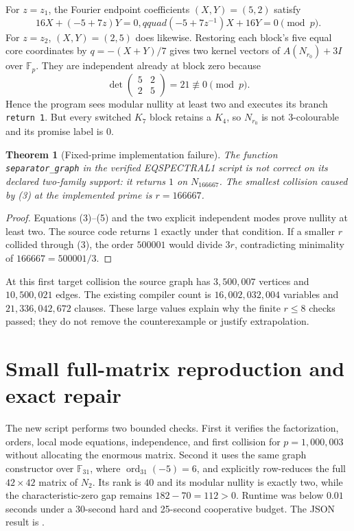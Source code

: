 \documentclass[11pt]{article}
\newtheorem{theorem}{Theorem}
\begin{document}
For $z=z_1$, the Fourier endpoint coefficients $(X,Y)=(5,2)$ satisfy
\[
 16X+(-5+7z)Y=0,qquad
 (-5+7z^{-1})X+16Y=0\pmod p.
\]
For $z=z_2$, $(X,Y)=(2,5)$ does likewise.  Restoring each block's five equal
core coordinates by $q=-(X+Y)/7$ gives two kernel vectors of
$A(N_{r_0})+3I$ over $\mathbb F_p$.  They are independent already at block
zero because
\[
 \det\begin{pmatrix}5&2\\2&5\end{pmatrix}=21\not\equiv0\pmod p.
\]
Hence the program sees modular nullity at least two and executes its branch
\texttt{return 1}.  But every switched $K_7$ block retains a $K_4$, so
$N_{r_0}$ is not 3-colourable and its promise label is $0$.

\begin{theorem}[Fixed-prime implementation failure]
The function \texttt{separator\_graph} in the verified EQSPECTRAL1 script is
not correct on its declared two-family support: it returns $1$ on
$N_{166667}$.  The smallest collision caused by (3) at the implemented prime
is $r=166667$.
\end{theorem}
\begin{proof}
Equations (3)--(5) and the two explicit independent modes prove nullity at
least two.  The source code returns $1$ exactly under that condition.  If a
smaller $r$ collided through (3), the order $500001$ would divide $3r$,
contradicting minimality of $166667=500001/3$.
\end{proof}

At this first target collision the source graph has $3{,}500{,}007$ vertices
and $10{,}500{,}021$ edges.  The existing compiler count is
$16{,}002{,}032{,}004$ variables and $21{,}336{,}042{,}672$ clauses.  These
large values explain why the finite $r\le8$ checks passed; they do not remove
the counterexample or justify extrapolation.

\section{Small full-matrix reproduction and exact repair}
The new script
 performs two
bounded checks.  First it verifies the factorization, orders, local mode
equations, independence, and first collision for $p=1{,}000{,}003$ without
allocating the enormous matrix.  Second it uses the same graph constructor
over $\mathbb F_{31}$, where $\operatorname{ord}_{31}(-5)=6$, and explicitly
row-reduces the full $42\times42$ matrix of $N_2$.  Its rank is $40$ and its
modular nullity is exactly two, while the characteristic-zero gap remains
$182-70=112>0$.  Runtime was below $0.01$ seconds under a 30-second hard and
25-second cooperative budget.  The JSON result is
.
\end{document}
